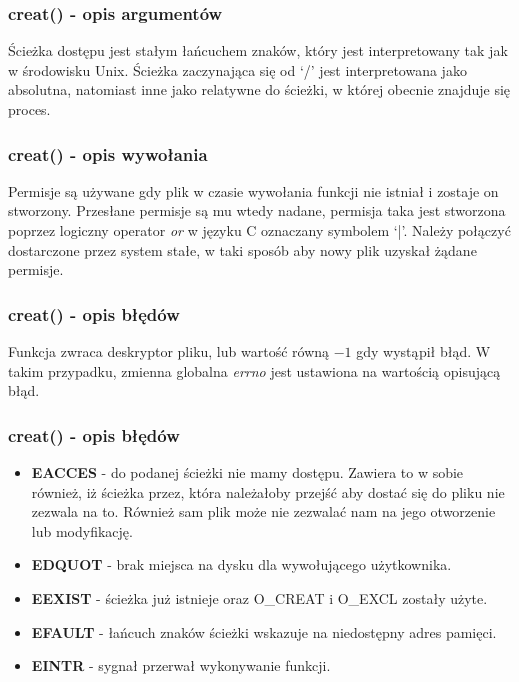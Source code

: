 \documentclass{beamer}
\begin{document}
\begin{frame}
	\frametitle{creat() - opis argumentów}
Ścieżka dostępu jest stałym łańcuchem znaków, który jest interpretowany tak jak w środowisku Unix.
Ścieżka zaczynająca się od `/' jest interpretowana jako absolutna, natomiast inne jako relatywne do
ścieżki, w której obecnie znajduje się proces.
\end{frame}

\begin{frame}
	\frametitle{creat() - opis wywołania}
Permisje są używane gdy plik w czasie wywołania funkcji nie istniał i zostaje on stworzony.
Przesłane permisje są mu wtedy nadane, permisja taka jest stworzona poprzez logiczny operator
\textit{or} w języku C oznaczany symbolem `|'. Należy połączyć dostarczone przez system stałe,
w taki sposób aby nowy plik uzyskał żądane permisje.
\end{frame}

\begin{frame}
	\frametitle{creat() - opis błędów}
Funkcja zwraca deskryptor pliku, lub wartość równą $-1$ gdy wystąpił błąd.
W takim przypadku, zmienna globalna \textit{errno} jest ustawiona na wartością opisującą błąd.
\end{frame}

\begin{frame}
	\frametitle{creat() - opis błędów}
\begin{itemize}
\item \textbf{EACCES} - do podanej ścieżki nie mamy dostępu. Zawiera to w sobie również,
iż ścieżka przez, która należałoby przejść aby dostać się do pliku nie zezwala na to.
Również sam plik może nie zezwalać nam na jego otworzenie lub modyfikację.
\item \textbf{EDQUOT} - brak miejsca na dysku dla wywołującego użytkownika.
\item \textbf{EEXIST} - ścieżka już istnieje oraz O\_CREAT i O\_EXCL zostały użyte.
\item \textbf{EFAULT} - łańcuch znaków ścieżki wskazuje na niedostępny adres pamięci.
\item \textbf{EINTR} - sygnał przerwał wykonywanie funkcji.
\end{itemize}
\end{frame}
\end{document}
